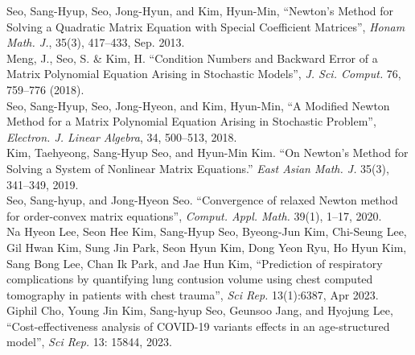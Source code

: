 	Seo, Sang-Hyup, Seo, Jong-Hyun, and Kim, Hyun-Min, ``Newton’s Method for Solving a Quadratic Matrix Equation with Special Coefficient Matrices'', {\it Honam Math. J.}, 35(3), 417--433, Sep. 2013. \\
	Meng, J., Seo, S. \& Kim, H. ``Condition Numbers and Backward Error of a Matrix Polynomial Equation Arising in Stochastic Models'', {\it J. Sci. Comput.} 76, 759--776 (2018). \\
	Seo, Sang-Hyup, Seo, Jong-Hyeon, and Kim, Hyun-Min, ``A Modified Newton Method for a Matrix Polynomial Equation Arising in Stochastic Problem'', {\it Electron. J. Linear Algebra}, 34, 500--513, 2018. \\
	Kim, Taehyeong, Sang-Hyup Seo, and Hyun-Min Kim. ``On Newton's Method for Solving a System of Nonlinear Matrix Equations.'' {\it East Asian Math. J.} 35(3), 341--349, 2019. \\
	Seo, Sang-hyup, and Jong-Hyeon Seo. ``Convergence of relaxed Newton method for order-convex matrix equations'', {\it Comput. Appl. Math.} 39(1), 1--17, 2020. \\
	Na Hyeon Lee, Seon Hee Kim, Sang-Hyup Seo, Byeong-Jun Kim, Chi-Seung Lee, Gil Hwan Kim, Sung Jin Park, Seon Hyun Kim, Dong Yeon Ryu, Ho Hyun Kim, Sang Bong Lee, Chan Ik Park, and Jae Hun Kim, ``Prediction of respiratory complications by quantifying lung contusion volume using chest computed tomography in patients with chest trauma'', {\it Sci Rep.} 13(1):6387, Apr 2023. \\
	Giphil Cho, Young Jin Kim, Sang-hyup Seo, Geunsoo Jang, and Hyojung Lee, ``Cost-effectiveness analysis of COVID-19 variants effects in an age-structured model'', {\it Sci Rep.} 13: 15844, 2023.